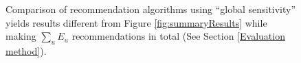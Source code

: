\begin{figure}[h]
  \begin{center}
  \end{center}
  \caption{Comparison of recommendation algorithms using ``global sensitivity'' yields results different from Figure \ref{fig:summaryResults} while making $\sum_u E_u$ recommendations in total (See Section \ref{Evaluation method}).}
  \label{fig:linkPredictionEvaluation}
\end{figure}

